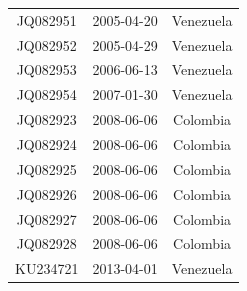 \documentclass[a4paper,10pt]{article}
\begin{document}
\begin{center}
\begin{longtable}{ccc}
JQ082951 & 2005-04-20 & Venezuela \\
JQ082952 & 2005-04-29 & Venezuela \\
JQ082953 & 2006-06-13 & Venezuela \\
JQ082954 & 2007-01-30 & Venezuela \\
JQ082923 & 2008-06-06 & Colombia \\
JQ082924 & 2008-06-06 & Colombia \\
JQ082925 & 2008-06-06 & Colombia \\
JQ082926 & 2008-06-06 & Colombia \\
JQ082927 & 2008-06-06 & Colombia \\
JQ082928 & 2008-06-06 & Colombia \\
KU234721 & 2013-04-01 & Venezuela
 \end{longtable}
\end{center}
\end{document}
